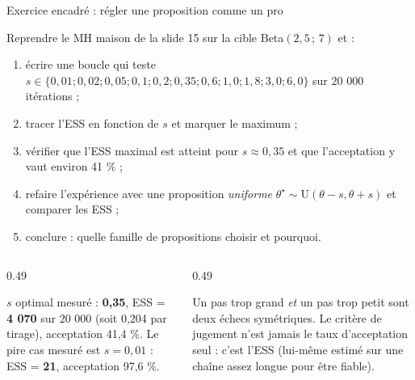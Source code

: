 \begin{frame}{Exercice encadré : régler une proposition comme un pro}
\footnotesize
\begin{abox}
Reprendre le MH maison de la slide 15 sur la cible Beta$(2{,}5\,;\,7)$ et :
\begin{enumerate}
  \item écrire une boucle qui teste $s \in \{0{,}01 ; 0{,}02 ; 0{,}05 ; 0{,}1 ;
        0{,}2 ; 0{,}35 ; 0{,}6 ; 1{,}0 ; 1{,}8 ; 3{,}0 ; 6{,}0\}$ sur 20 000 itérations ;
  \item tracer l'ESS en fonction de $s$ et marquer le maximum ;
  \item vérifier que l'ESS maximal est atteint pour $s \approx 0{,}35$ et que
        l'acceptation y vaut environ 41 \% ;
  \item refaire l'expérience avec une proposition \emph{uniforme}
        $\theta^\star \sim \mathrm{U}(\theta - s, \theta + s)$ et comparer les ESS ;
  \item conclure : quelle famille de propositions choisir et pourquoi.
\end{enumerate}
\end{abox}
\vspace{1mm}
\begin{columns}[t]
\begin{column}{0.49\textwidth}
\begin{solbox}
$s$ optimal mesuré : \textbf{0,35}, ESS = \textbf{4 070} sur 20 000
(soit 0,204 par tirage), acceptation 41,4 \%. Le pire cas mesuré est
$s = 0{,}01$ : ESS = \textbf{21}, acceptation 97,6 \%.
\end{solbox}
\end{column}
\begin{column}{0.49\textwidth}
\begin{kbox}
Un pas trop grand \emph{et} un pas trop petit sont deux échecs symétriques. Le
critère de jugement n'est jamais le taux d'acceptation seul : c'est l'ESS
(lui-m\^eme estimé sur une chaîne assez longue pour être fiable).
\end{kbox}
\end{column}
\end{columns}
\end{frame}

